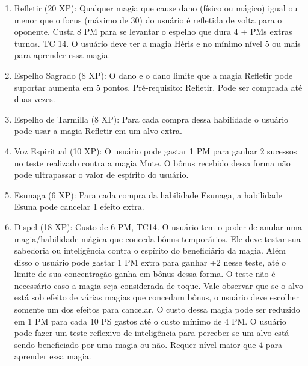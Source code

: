 \begin{enumerate}

\item Refletir (20 XP): Qualquer magia que cause dano (físico ou mágico) igual ou menor que o focus (máximo de 30) do usuário é refletida de volta para o oponente. Custa 8 PM para se levantar o espelho que dura 4 + PMs extras turnos. TC 14. O usuário deve ter a magia Héris e no mínimo nível 5 ou mais para aprender essa magia. 

	\item Espelho Sagrado (8 XP): O dano e o dano limite que a magia Refletir pode suportar aumenta em 5 pontos. Pré-requisito: Refletir. Pode ser comprada até duas vezes.
	
	\item Espelho de Tarmilla (8 XP): Para cada compra dessa habilidade o usuário pode usar a magia Refletir em um alvo extra.	
	
	\item Voz Espiritual (10 XP): O usuário pode gastar 1 PM para ganhar 2 sucessos no teste realizado contra a magia Mute. O bônus recebido dessa forma não pode ultrapassar o valor de espírito do usuário.

 \item Esunaga (6 XP): Para cada compra da habilidade Esunaga, a habilidade Esuna pode cancelar 1 efeito extra.
 
\item Dispel (18 XP): Custo de 6 PM, TC14.\newline
O usuário tem o poder de anular uma magia/habilidade mágica que conceda bônus temporários. Ele deve testar sua sabedoria ou inteligência contra o espírito do beneficiário da magia. Além disso o usuário pode gastar 1 PM extra para ganhar +2 nesse teste, até o limite de sua concentração ganha em bônus dessa forma. O teste não é necessário caso a magia seja considerada de toque. Vale observar que se o alvo está sob efeito de várias magias que concedam bônus, o usuário deve escolher somente um dos efeitos para cancelar. O custo dessa magia pode ser reduzido em 1 PM para cada 10 PS gastos até o custo mínimo de 4 PM. O usuário pode fazer um teste reflexivo de inteligência para perceber se um alvo está sendo beneficiado por uma magia ou não. Requer nível maior que 4 para aprender essa magia.


\end{enumerate}
